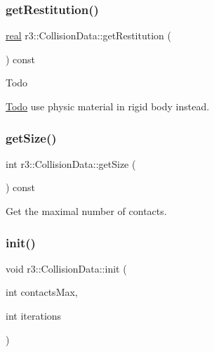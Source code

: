 \subsubsection{\texorpdfstring{get\+Restitution()}{getRestitution()}}
{\footnotesize\ttfamily \mbox{\hyperlink{namespacer3_ab2016b3e3f743fb735afce242f0dc1eb}{real}} r3\+::\+Collision\+Data\+::get\+Restitution (\begin{DoxyParamCaption}{ }\end{DoxyParamCaption}) const\hspace{0.3cm}{\ttfamily [inline]}}

\begin{DoxyRefDesc}{Todo}
\item[\mbox{\hyperlink{todo__todo000003}{Todo}}]use physic material in rigid body instead. \end{DoxyRefDesc}
\mbox{\label{classr3_1_1_collision_data_ad0898e21e34b4558dbdd68dd115c49d8}} 
\subsubsection{\texorpdfstring{get\+Size()}{getSize()}}
{\footnotesize\ttfamily int r3\+::\+Collision\+Data\+::get\+Size (\begin{DoxyParamCaption}{ }\end{DoxyParamCaption}) const}

Get the maximal number of contacts. \mbox{\label{classr3_1_1_collision_data_a2af69fd6da492254b1a134d4ef82efce}} 
\subsubsection{\texorpdfstring{init()}{init()}}
{\footnotesize\ttfamily void r3\+::\+Collision\+Data\+::init (\begin{DoxyParamCaption}\item[{int}]{contacts\+Max,  }\item[{int}]{iterations }\end{DoxyParamCaption})}

\mbox{\label{classr3_1_1_collision_data_a3b97a4828252625e891c939ad7ce0064}} 
